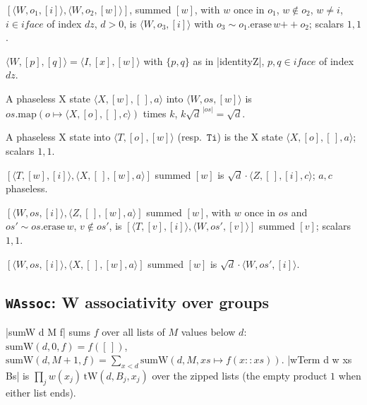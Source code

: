 \begin{description}[style=nextline,font=\normalfont\ttfamily]
\item[wFusion] $[\langle W,o_1,[i]\rangle,\langle W,o_2,[w]\rangle]$, summed $[w]$, with $w$ once in
  $o_1$, $w\notin o_2$, $w\ne i$, $i\in\mathit{iface}$ of index $dz$, $d>0$, is
  $\langle W,o_3,[i]\rangle$ with $o_3\sim o_1.\mathrm{erase}\,w\mathbin{+\!\!+}o_2$; scalars $1,1$.
\item[wIdentity] $\langle W,[p],[q]\rangle=\langle I,[x],[w]\rangle$ with $\{p,q\}$ as in
  \lean|identityZ|, $p,q\in\mathit{iface}$ of index $dz$.
\item[wZeroCopy] A phaseless X state $\langle X,[w],[\,],a\rangle$ into $\langle W,os,[w]\rangle$
  is $os.\mathrm{map}(o\mapsto\langle X,[o],[\,],c\rangle)$ times $k$, $k\sqrt d^{\,|os|}=\sqrt d$.
\item[triZeroState, triInvZeroState] A phaseless X state into $\langle T,[o],[w]\rangle$ (resp.\
  $\mathtt{Ti}$) is the X state $\langle X,[o],[\,],a\rangle$; scalars $1,1$.
\item[triZeroEffect] $[\langle T,[w],[i]\rangle,\langle X,[\,],[w],a\rangle]$ summed $[w]$ is
  $\sqrt d\cdot\langle Z,[\,],[i],c\rangle$; $a,c$ phaseless.
\item[wZEffect] $[\langle W,os,[i]\rangle,\langle Z,[\,],[w],a\rangle]$ summed $[w]$, with $w$ once
  in $os$ and $os'\sim os.\mathrm{erase}\,w$, $v\notin os'$, is
  $[\langle T,[v],[i]\rangle,\langle W,os',[v]\rangle]$ summed $[v]$; scalars $1,1$.
\item[wZeroEffect] $[\langle W,os,[i]\rangle,\langle X,[\,],[w],a\rangle]$ summed $[w]$ is
  $\sqrt d\cdot\langle W,os',[i]\rangle$.
\end{description}

\subsection{\texttt{WAssoc}: W associativity over groups}

\begin{definition}
\lean|sumW d M f| sums $f$ over all lists of $M$ values below $d$:
$\mathrm{sumW}(d,0,f)=f([\,])$, $\mathrm{sumW}(d,M{+}1,f)=\sum_{x<d}\mathrm{sumW}(d,M,xs\mapsto f(x{::}xs))$.
\lean|wTerm d w xs Bs| is $\prod_j w(x_j)\,\mathrm{tW}(d,B_j,x_j)$ over the zipped lists (the empty
product $1$ when either list ends).
\end{definition}

